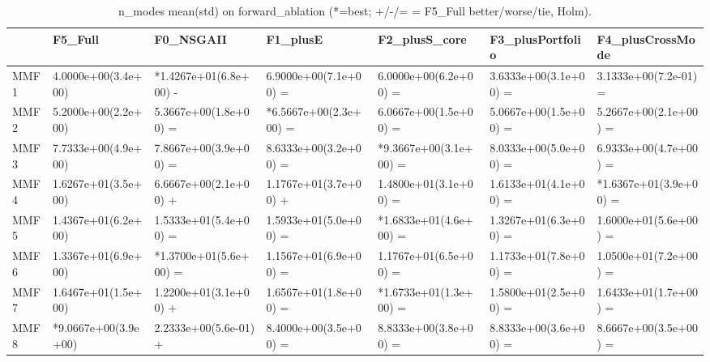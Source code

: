\begin{table}[t]
\centering
\caption{n_modes mean(std) on forward_ablation (*=best; +/-/= = F5_Full better/worse/tie, Holm).}
\label{tab:forward_ablation_n_modes}
\begin{tabular}{lllllll}
\toprule
 & F5\_Full & F0\_NSGAII & F1\_plusE & F2\_plusS\_core & F3\_plusPortfolio & F4\_plusCrossMode \\
\midrule
MMF1 & 4.0000e+00(3.4e+00) & *1.4267e+01(6.8e+00) - & 6.9000e+00(7.1e+00) = & 6.0000e+00(6.2e+00) = & 3.6333e+00(3.1e+00) = & 3.1333e+00(7.2e-01) = \\
MMF2 & 5.2000e+00(2.2e+00) & 5.3667e+00(1.8e+00) = & *6.5667e+00(2.3e+00) = & 6.0667e+00(1.5e+00) = & 5.0667e+00(1.5e+00) = & 5.2667e+00(2.1e+00) = \\
MMF3 & 7.7333e+00(4.9e+00) & 7.8667e+00(3.9e+00) = & 8.6333e+00(3.2e+00) = & *9.3667e+00(3.1e+00) = & 8.0333e+00(5.0e+00) = & 6.9333e+00(4.7e+00) = \\
MMF4 & 1.6267e+01(3.5e+00) & 6.6667e+00(2.1e+00) + & 1.1767e+01(3.7e+00) + & 1.4800e+01(3.1e+00) = & 1.6133e+01(4.1e+00) = & *1.6367e+01(3.9e+00) = \\
MMF5 & 1.4367e+01(6.2e+00) & 1.5333e+01(5.4e+00) = & 1.5933e+01(5.0e+00) = & *1.6833e+01(4.6e+00) = & 1.3267e+01(6.3e+00) = & 1.6000e+01(5.6e+00) = \\
MMF6 & 1.3367e+01(6.9e+00) & *1.3700e+01(5.6e+00) = & 1.1567e+01(6.9e+00) = & 1.1767e+01(6.5e+00) = & 1.1733e+01(7.8e+00) = & 1.0500e+01(7.2e+00) = \\
MMF7 & 1.6467e+01(1.5e+00) & 1.2200e+01(3.1e+00) + & 1.6567e+01(1.8e+00) = & *1.6733e+01(1.3e+00) = & 1.5800e+01(2.5e+00) = & 1.6433e+01(1.7e+00) = \\
MMF8 & *9.0667e+00(3.9e+00) & 2.2333e+00(5.6e-01) + & 8.4000e+00(3.5e+00) = & 8.8333e+00(3.8e+00) = & 8.8333e+00(3.6e+00) = & 8.6667e+00(3.5e+00) = \\
\bottomrule
\end{tabular}
\end{table}
